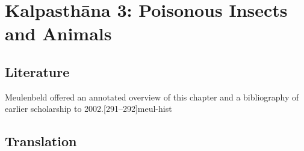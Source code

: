 \chapter{Kalpasthāna 3: Poisonous Insects and Animals}

\section{Literature}

Meulenbeld offered an annotated overview of this chapter and a
bibliography of earlier scholarship to 2002.[291--292]{meul-hist}


\section{Translation}

